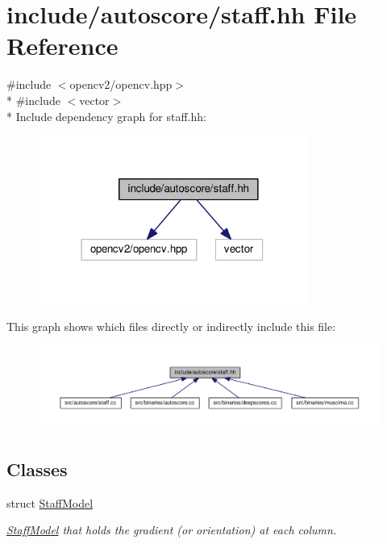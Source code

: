 \hypertarget{staff_8hh}{}\section{include/autoscore/staff.hh File Reference}
\label{staff_8hh}
{\ttfamily \#include $<$opencv2/opencv.\+hpp$>$}\\*
{\ttfamily \#include $<$vector$>$}\\*
Include dependency graph for staff.\+hh\+:
\nopagebreak
\begin{figure}[H]
\begin{center}
\leavevmode
\includegraphics[width=249pt]{staff_8hh__incl}
\end{center}
\end{figure}
This graph shows which files directly or indirectly include this file\+:
\nopagebreak
\begin{figure}[H]
\begin{center}
\leavevmode
\includegraphics[width=350pt]{staff_8hh__dep__incl}
\end{center}
\end{figure}
\subsection*{Classes}
\begin{DoxyCompactItemize}
\item 
struct \hyperlink{structStaffModel}{Staff\+Model}
\begin{DoxyCompactList}\small\item\em \hyperlink{structStaffModel}{Staff\+Model} that holds the gradient (or orientation) at each column. \end{DoxyCompactList}\end{DoxyCompactItemize}
